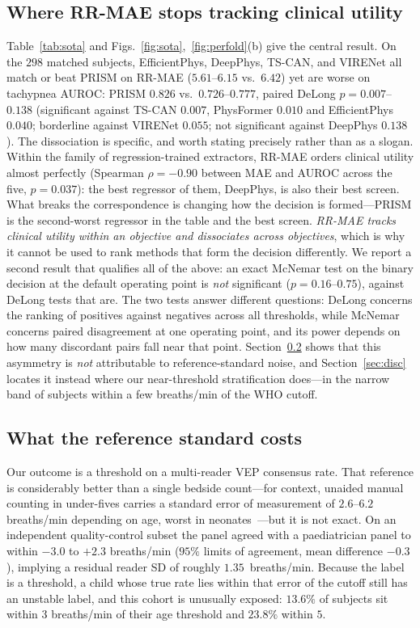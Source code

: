 \documentclass[journal]{IEEEtran}
\begin{document}
\subsection{Where RR-MAE stops tracking clinical utility}\label{sec:sota}
Table~\ref{tab:sota} and Figs.~\ref{fig:sota},~\ref{fig:perfold}(b) give the central result. On the
$298$ matched subjects, EfficientPhys, DeepPhys, TS-CAN, and VIRENet all match or beat PRISM on RR-MAE
($5.61$--$6.15$ vs.\ $6.42$) yet are worse on tachypnea AUROC: PRISM $0.826$ vs.\
$0.726$--$0.777$, paired DeLong $p=0.007$--$0.138$ (significant against TS-CAN $0.007$, PhysFormer
$0.010$ and EfficientPhys $0.040$; borderline against VIRENet $0.055$; not significant against DeepPhys
$0.138$). The dissociation is specific, and worth stating precisely rather than as a slogan. Within the
family of regression-trained extractors, RR-MAE orders clinical utility almost perfectly (Spearman
$\rho=-0.90$ between MAE and AUROC across the five, $p=0.037$): the best regressor of them, DeepPhys, is
also their best screen. What breaks the correspondence is changing how the decision is formed---PRISM is
the second-worst regressor in the table and the best screen. \emph{RR-MAE tracks clinical utility within
an objective and dissociates across objectives}, which is why it cannot be used to rank methods that
form the decision differently. We report a second result that qualifies all of the above: an exact
McNemar test on the binary decision at the default operating point is \emph{not} significant
($p=0.16$--$0.75$), against DeLong tests that are. The two tests answer different questions: DeLong
concerns the ranking of positives against negatives across all thresholds, while McNemar concerns paired
disagreement at one operating point, and its power depends on how many discordant pairs fall near that
point. Section~\ref{sec:ceiling} shows that this asymmetry is \emph{not} attributable to reference-standard
noise, and Section~\ref{sec:disc} locates it instead where our near-threshold stratification does---in the
narrow band of subjects within a few breaths/min of the WHO cutoff.

\subsection{What the reference standard costs}\label{sec:ceiling}
Our outcome is a threshold on a multi-reader VEP consensus rate. That reference is considerably better
than a single bedside count---for context, unaided manual counting in under-fives carries a standard
error of measurement of $2.6$--$6.2$ breaths/min depending on age, worst in
neonates~\cite{rr_interobserver}---but it is not exact. On an independent quality-control subset the
panel agreed with a paediatrician panel to within $-3.0$ to $+2.3$ breaths/min ($95\%$ limits of
agreement, mean difference $-0.3$), implying a residual reader SD of roughly $1.35$~breaths/min. Because
the label is a threshold, a child whose true rate lies within that error of the cutoff still has an
unstable label, and this cohort is unusually exposed: $13.6\%$ of subjects sit within $3$ breaths/min of
their age threshold and $23.8\%$ within $5$.
\end{document}
